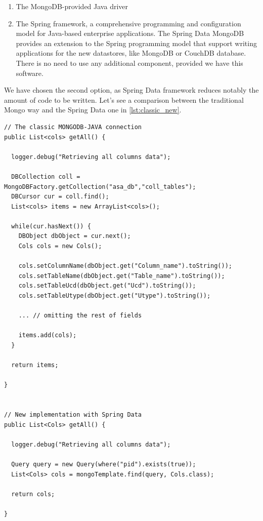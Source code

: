 \begin{enumerate}

\item The MongoDB-provided Java driver 

\item The Spring framework, a comprehensive programming and configuration model for Java-based enterprise applications. The Spring Data MongoDB  provides an extension to the Spring programming model that support writing applications for the new datastores, like MongoDB or CouchDB database. There is no need to use any additional component, provided we have this software.

\end{enumerate}

We have chosen the second option, as Spring Data framework reduces notably the amount of code to be written. Let's see a comparison between the traditional Mongo way and the Spring Data one in \ref{lst:classic_new}.

\begin{lstlisting}[float,label=lst:classic_new,caption=Old vs new syntax Mongo-Java connection.]
// The classic MONGODB-JAVA connection
public List<cols> getAll() {
  
  logger.debug("Retrieving all columns data");

  DBCollection coll = MongoDBFactory.getCollection("asa_db","coll_tables");
  DBCursor cur = coll.find();
  List<cols> items = new ArrayList<cols>();

  while(cur.hasNext()) {
    DBObject dbObject = cur.next();
    Cols cols = new Cols();

    cols.setColumnName(dbObject.get("Column_name").toString());
    cols.setTableName(dbObject.get("Table_name").toString());
    cols.setTableUcd(dbObject.get("Ucd").toString());
    cols.setTableUtype(dbObject.get("Utype").toString());
    
    ... // omitting the rest of fields

    items.add(cols);
  }

  return items;

}


// New implementation with Spring Data
public List<Cols> getAll() {

  logger.debug("Retrieving all columns data");

  Query query = new Query(where("pid").exists(true));
  List<Cols> cols = mongoTemplate.find(query, Cols.class);

  return cols;

}
\end{lstlisting}



